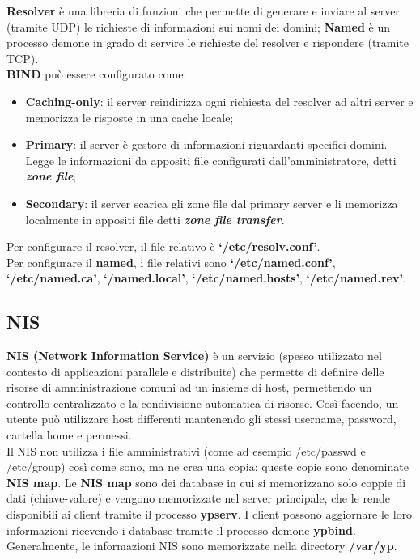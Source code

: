             \textbf{Resolver} è una libreria di funzioni che permette di generare e inviare al server (tramite UDP)
            le richieste di informazioni sui nomi dei domini; \textbf{Named} è un processo demone in grado di
            servire le richieste del resolver e rispondere (tramite TCP).\\

            \textbf{BIND} può essere configurato come:
            
            \begin{itemize}
                \item \textbf{Caching-only}: il server reindirizza ogni richiesta del resolver ad altri server e
                memorizza le risposte in una cache locale;
                \item \textbf{Primary}: il server è gestore di informazioni riguardanti specifici domini. Legge le
                informazioni da appositi file configurati dall’amministratore, detti \textbf{\emph{zone file}};
                \item \textbf{Secondary}: il server scarica gli zone file dal primary server e li memorizza localmente
                in appositi file detti \textbf{\emph{zone file transfer}}.
            \end{itemize}

            Per configurare il resolver, il file relativo è \textbf{‘/etc/resolv.conf’}.\\
            Per configurare il \textbf{named}, i file relativi sono \textbf{‘/etc/named.conf’}, \textbf{‘/etc/named.ca’},
            \textbf{‘/named.local’}, \textbf{‘/etc/named.hosts’}, \textbf{‘/etc/named.rev’}.
    
    \subsection{NIS}

        \textbf{NIS (Network Information Service)} è un servizio (spesso utilizzato nel contesto di
        applicazioni parallele e distribuite) che permette di definire delle risorse di amministrazione
        comuni ad un insieme di host, permettendo un controllo centralizzato e la condivisione
        automatica di risorse. Così facendo, un utente può utilizzare host differenti mantenendo gli
        stessi username, password, cartella home e permessi.\\

        Il NIS non utilizza i file amministrativi (come ad esempio /etc/passwd e /etc/group) così come
        sono, ma ne crea una copia: queste copie sono denominate \textbf{NIS map}. Le \textbf{NIS map} sono dei
        database in cui si memorizzano solo coppie di dati (chiave-valore) e vengono memorizzate nel
        server principale, che le rende disponibili ai client tramite il processo \textbf{ypserv}. I client possono
        aggiornare le loro informazioni ricevendo i database tramite il processo demone \textbf{ypbind}.
        Generalmente, le informazioni NIS sono memorizzate nella directory \textbf{/var/yp}.\\

